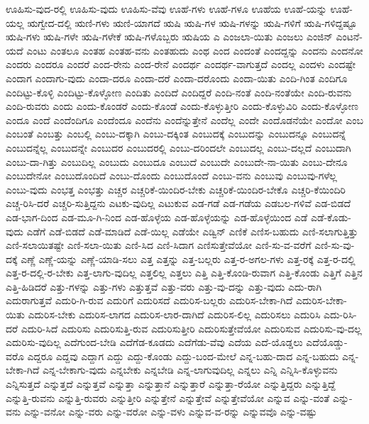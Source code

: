 {ಊಹಿಸು-ವುದ-ರಲ್ಲಿ
ಊಹಿಸು-ವುದು
ಊಹಿಸು-ವೆವು
ಊಹೆ-ಗಳು
ಊಹೆ-ಗಳೂ
ಊಹೆಯ
ಊಹೆ-ಯನ್ನು
ಊಹೆ-ಯಲ್ಲ
ಋಗ್ವೇದ-ದಲ್ಲಿ
ಋಣಿ-ಗಳು
ಋಣಿ-ಯಾಗದೆ
ಋಷಿ
ಋಷಿ-ಗಳ
ಋಷಿ-ಗಳನ್ನು
ಋಷಿ-ಗಳಿಗೆ
ಋಷಿ-ಗಳಿದ್ದಷ್ಟೂ
ಋಷಿ-ಗಳು
ಋಷಿ-ಗಳೇ
ಋಷಿ-ಗಳೇಕೆ
ಋಷಿ-ಗಳೊಬ್ಬರು
ಋಷಿಯ
ಎ
ಎಂಜಲಾ-ಯಿತು
ಎಂಜಲು
ಎಂಜಿನ್
ಎಂಟನೆ-ಯದೆ
ಎಂಟು
ಎಂತಲೂ
ಎಂತಹ
ಎಂತಹ-ವನು
ಎಂತಹುದು
ಎಂಥ
ಎಂದ
ಎಂದಂತೆ
ಎಂದದ್ದನ್ನು
ಎಂದನು
ಎಂದನೋ
ಎಂದರು
ಎಂದರೂ
ಎಂದರೆ
ಎಂದ-ರೇನು
ಎಂದ-ರೇನೆ
ಎಂದರ್ಥ
ಎಂದರ್ಥ-ವಾಗುತ್ತದೆ
ಎಂದಲ್ಲ
ಎಂದಳು
ಎಂದಷ್ಟೇ
ಎಂದಾಗ
ಎಂದಾಗು-ವುದು
ಎಂದಾ-ದರೂ
ಎಂದಾ-ದರೆ
ಎಂದಾ-ದರೊಂದು
ಎಂದಾ-ಯಿತು
ಎಂದಿ-ಗಿಂತ
ಎಂದಿಗೂ
ಎಂದಿಟ್ಟು-ಕೊಳ್ಳಿ
ಎಂದಿಟ್ಟು-ಕೊಳ್ಳೋಣ
ಎಂದಿತು
ಎಂದಿದೆ
ಎಂದಿದ್ದರೆ
ಎಂದಿ-ನಂತೆ
ಎಂದಿ-ನಂತೆಯೇ
ಎಂದಿ-ರುವನು
ಎಂದಿ-ರುವರು
ಎಂದು
ಎಂದು-ಕೊಂಡರೆ
ಎಂದು-ಕೊಂಡೆ
ಎಂದು-ಕೊಳ್ಳುತ್ತೀರಿ
ಎಂದು-ಕೊಳ್ಳುವಿರಿ
ಎಂದು-ಕೊಳ್ಳೋಣ
ಎಂದೂ
ಎಂದೆ
ಎಂದೆಂದಿಗೂ
ಎಂದೆಂದೂ
ಎಂದೆನು
ಎಂದೆನ್ನುತ್ತೇನೆ
ಎಂದೆಲ್ಲ
ಎಂದೇ
ಎಂದೊಡನೆಯೇ
ಎಂದೋ
ಎಂಬ
ಎಂಬಂತೆ
ಎಂಬತ್ತು
ಎಂಬಲ್ಲಿ
ಎಂಬು-ದಕ್ಕಾಗಿ
ಎಂಬು-ದಕ್ಕಿಂತ
ಎಂಬುದಕ್ಕೆ
ಎಂಬುದನ್ನು
ಎಂಬುದನ್ನೂ
ಎಂಬುದನ್ನೆ
ಎಂಬುದನ್ನೆಲ್ಲ
ಎಂಬುದನ್ನೇ
ಎಂಬುದರ
ಎಂಬುದರಲ್ಲಿ
ಎಂಬು-ದರಿಂದಲೇ
ಎಂಬುದಲ್ಲ
ಎಂಬು-ದಲ್ಲದೆ
ಎಂಬುದಾಗಿ
ಎಂಬು-ದಾ-ಗಿತ್ತು
ಎಂಬುದಿಲ್ಲ
ಎಂಬುದು
ಎಂಬುದೂ
ಎಂಬುದೆ
ಎಂಬುದೇ
ಎಂಬುದೇ-ನಾ-ಯಿತು
ಎಂಬು-ದೇನೂ
ಎಂಬುದೇನೋ
ಎಂಬುದೊಂದಿದೆ
ಎಂಬು-ದೊಂದು
ಎಂಬುದೊಂದೆ
ಎಂಬು-ವನು
ಎಂಬುವು
ಎಂಬುವು-ಗಳೆಲ್ಲ
ಎಂಬು-ವುದು
ಎಂಭತ್ತ
ಎಂಭತ್ತು
ಎಚ್ಚರ
ಎಚ್ಚರಿಕೆ-ಯಿಂದಿರ-ಬೇಕು
ಎಚ್ಚರಿಕೆ-ಯಿಂದಿರ-ಬೇಕೊ
ಎಚ್ಚರಿ-ಕೆಯಿಂದಿರಿ
ಎಚ್ಚ-ರಿಸಿ-ದರೆ
ಎಚ್ಚರಿ-ಸುತ್ತಿದ್ದನು
ಎಟಕು-ವುದಿಲ್ಲ
ಎಟುಕುವ
ಎಡ-ಗಡೆ
ಎಡ-ಗಡೆಯ
ಎಡಬಲ-ಗಳಿವೆ
ಎಡ-ಬಿಡದೆ
ಎಡ-ಭಾಗ-ದಿಂದ
ಎಡ-ಮೂ-ಗಿ-ನಿಂದ
ಎಡ-ಹೊಳ್ಳೆಯ
ಎಡ-ಹೊಳ್ಳೆಯನ್ನು
ಎಡ-ಹೊಳ್ಳೆಯಿಂದ
ಎಡೆ
ಎಡೆ-ಕೊಡು-ವುದು
ಎಡೆಗೆ
ಎಡೆ-ಬಿಡದೆ
ಎಡೆ-ಮಾಡಿದೆ
ಎಡೆ-ಯಿಲ್ಲ
ಎಡೆಯೇ
ಎಡ್ವಿನ್
ಎಣಿಕೆ
ಎಣಿಸ-ಬಹುದು
ಎಣಿ-ಸಲಾಗುತ್ತಿತ್ತು
ಎಣಿ-ಸಲಾಯಿತಷ್ಟೇ
ಎಣಿ-ಸಲಾ-ಯಿತು
ಎಣಿ-ಸಿದ
ಎಣಿ-ಸಿದಾಗ
ಎಣಿಸುತ್ತೇವೆಯೋ
ಎಣಿ-ಸು-ವ-ವರೆಗೆ
ಎಣಿ-ಸು-ವು-ದಕ್ಕೆ
ಎಣ್ಣೆ
ಎಣ್ಣೆ-ಯನ್ನು
ಎಣ್ಣೆ-ಯಾಡಿ-ಸಲು
ಎತ್ತ
ಎತ್ತನ್ನು
ಎತ್ತ-ಬಲ್ಲರು
ಎತ್ತ-ರ-ಅಗಲ-ಗಳು
ಎತ್ತ-ರಕ್ಕೆ
ಎತ್ತ-ರ-ದಲ್ಲಿ
ಎತ್ತ-ರ-ದಲ್ಲಿ-ರ-ಬೇಕು
ಎತ್ತ-ಲಾಗು-ವುದಿಲ್ಲ
ಎತ್ತಲಿಲ್ಲ
ಎತ್ತಲು
ಎತ್ತಿ
ಎತ್ತಿ-ಕೊಂಡಿ-ರುವಾಗ
ಎತ್ತಿ-ಕೊಂಡು
ಎತ್ತಿಗೆ
ಎತ್ತಿನ
ಎತ್ತಿ-ಹಿಡಿದರೆ
ಎತ್ತು-ಗಳನ್ನು
ಎತ್ತು-ಗಳು
ಎತ್ತುತ್ತವೆ
ಎತ್ತು-ವರು
ಎತ್ತು-ವು-ದನ್ನು
ಎತ್ತು-ವುದು
ಎದು-ರಾಗಿ
ಎದುರಾಗುತ್ತವೆ
ಎದುರಿ-ಗಿ-ರುವ
ಎದುರಿಗೆ
ಎದುರಿಸದೆ
ಎದುರಿಸ-ಬಲ್ಲರು
ಎದುರಿಸ-ಬೇಕಾ-ಗಿದೆ
ಎದುರಿಸ-ಬೇಕಾ-ಯಿತು
ಎದುರಿಸ-ಬೇಕು
ಎದುರಿಸ-ಲಾಗದ
ಎದುರಿಸ-ಲಾರ-ದಾಗಿದೆ
ಎದುರಿಸ-ಲಿಲ್ಲ
ಎದುರಿಸಲು
ಎದುರಿಸಿ
ಎದು-ರಿಸಿ-ದರೆ
ಎದುರಿ-ಸಿದೆ
ಎದುರಿಸು
ಎದುರಿಸುತ್ತಿ-ರುವ
ಎದುರಿಸುತ್ತೀರಿ
ಎದುರಿಸುತ್ತೇವೆಯೋ
ಎದುರಿಸುವ
ಎದುರಿಸು-ವು-ದಲ್ಲ
ಎದುರಿಸು-ವುದಿಲ್ಲ
ಎದೆಗುಂದ-ಬೇಡಿ
ಎದೆಗೆಡ-ಕೂಡದು
ಎದೆಗೆಡು-ವೆವು
ಎದೆಯ
ಎದೆ-ಯೊಡ್ಡಲು
ಎದೆಯೊಡ್ಡು-ವರೊ
ಎದ್ದರೂ
ಎದ್ದವು
ಎದ್ದಾಗ
ಎದ್ದು
ಎದ್ದು-ಕೊಂಡು
ಎದ್ದು-ಬಂದ-ಮೇಲೆ
ಎನ್ನ-ಬಹು-ದಾದ
ಎನ್ನ-ಬಹುದು
ಎನ್ನ-ಬೇಕಾ-ಗಿದೆ
ಎನ್ನ-ಬೇಕಾಗು-ವುದು
ಎನ್ನಬೇಕು
ಎನ್ನಬೇಡಿ
ಎನ್ನ-ಲಾಗುವುದಿಲ್ಲ
ಎನ್ನಲು
ಎನ್ನಿ
ಎನ್ನಿಸಿ-ಕೊಳ್ಳುವನು
ಎನ್ನಿಸುತ್ತದೆ
ಎನ್ನುತ್ತದೆ
ಎನ್ನುತ್ತವೆ
ಎನ್ನುತ್ತಾ
ಎನ್ನುತ್ತಾನೆ
ಎನ್ನುತ್ತಾರೆ
ಎನ್ನುತ್ತಾ-ರೆಯೋ
ಎನ್ನುತ್ತಿದ್ದರು
ಎನ್ನುತ್ತಿದ್ದೆ
ಎನ್ನುತ್ತಿ-ರುವನು
ಎನ್ನುತ್ತಿ-ರುವರು
ಎನ್ನುತ್ತೀರಿ
ಎನ್ನುತ್ತೇನೆ
ಎನ್ನುತ್ತೇವೆ
ಎನ್ನುತ್ತೇವೆಯೋ
ಎನ್ನುವ
ಎನ್ನು-ವಂತೆ
ಎನ್ನು-ವನು
ಎನ್ನು-ವನೋ
ಎನ್ನು-ವರು
ಎನ್ನು-ವರೋ
ಎನ್ನು-ವಳು
ಎನ್ನುವ-ವ-ರನ್ನು
ಎನ್ನುವವೊ
ಎನ್ನು-ವಷ್ಟು
}
